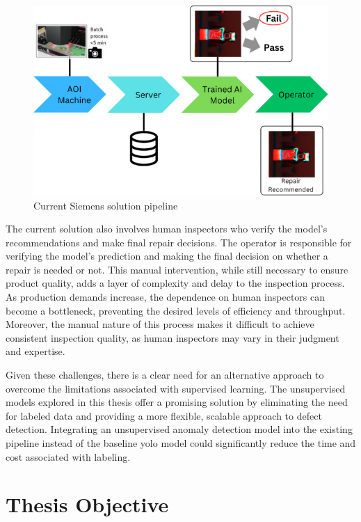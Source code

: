 \begin{figure}[ht!]
    \centering
    \includegraphics[width=1\linewidth]{Images/Solution_Pipeline.png}
    \caption{Current Siemens solution pipeline}
    \label{fig:solution pipeline}
\end{figure}

The current solution also involves human inspectors who verify the model's recommendations and make final repair decisions. The operator is responsible for verifying the model's prediction and making the final decision on whether a repair is needed or not. This manual intervention, while still necessary to ensure product quality, adds a layer of complexity and delay to the inspection process. As production demands increase, the dependence on human inspectors can become a bottleneck, preventing the desired levels of efficiency and throughput. Moreover, the manual nature of this process makes it difficult to achieve consistent inspection quality, as human inspectors may vary in their judgment and expertise.

Given these challenges, there is a clear need for an alternative approach to overcome the limitations associated with supervised learning. The unsupervised models explored in this thesis offer a promising solution by eliminating the need for labeled data and providing a more flexible, scalable approach to defect detection. Integrating an unsupervised anomaly detection model into the existing pipeline instead of the baseline \gls{yolo} model could significantly reduce the time and cost associated with labeling. 

\section{Thesis Objective}

